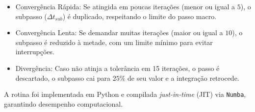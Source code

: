\begin{itemize}
	\item Convergência Rápida: Se atingida em poucas iterações (menor ou igual a $5$), o subpasso ($\Delta t_{sub}$) é duplicado, respeitando o limite do passo macro.
	\item Convergência Lenta: Se demandar muitas iterações (maior ou igual a $10$), o subpasso é reduzido à metade, com um limite mínimo para evitar interrupções.
	\item Divergência: Caso não atinja a tolerância em 15 iterações, o passo é descartado, o subpasso cai para $25\%$ de seu valor e a integração retrocede.
\end{itemize}

A rotina foi implementada em Python e compilada \textit{just-in-time} (JIT) via \texttt{Numba}, garantindo desempenho computacional.